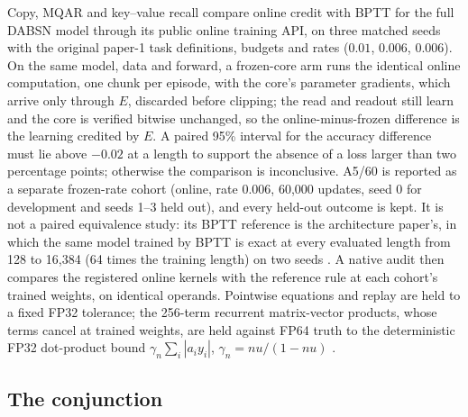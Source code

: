 \documentclass[11pt]{article}
\theoremstyle{definition}
\begin{document}
Copy, MQAR and key--value recall compare online credit with BPTT for the full DABSN
model through its public online training API, on three matched seeds with the
original paper-1 task definitions, budgets and rates ($0.01$, $0.006$, $0.006$).
On the same model, data and forward, a frozen-core arm runs the identical online
computation, one chunk per episode, with the core's parameter gradients, which arrive
only through $E$, discarded before clipping; the read and readout still learn and the
core is verified bitwise unchanged, so the online-minus-frozen difference is the
learning credited by $E$. A
paired 95\% interval for the accuracy difference must lie above $-0.02$ at a length
to support the absence of a loss larger than two percentage points; otherwise the
comparison is inconclusive. A5/60 is reported as a separate frozen-rate cohort
(online, rate $0.006$, 60,000 updates, seed 0 for development and seeds 1--3 held
out), and every held-out outcome is kept. It is not a paired equivalence study: its
BPTT reference is the architecture paper's, in which the same model trained by BPTT
is exact at every evaluated length from 128 to 16,384 (64 times the training length)
on two seeds \citep{rosdahl2026dabsn}. A native audit then compares
the registered online kernels with the reference rule at each cohort's trained
weights, on identical operands. Pointwise equations and replay are held to a fixed
FP32 tolerance; the 256-term recurrent matrix-vector products, whose terms cancel at
trained weights, are held against FP64 truth to the deterministic FP32 dot-product
bound $\gamma_n\sum_i|a_iy_i|$, $\gamma_n=nu/(1-nu)$ \citep{higham2002accuracy}.

\subsection{The conjunction}
\label{sec:conjunction}
\end{document}
